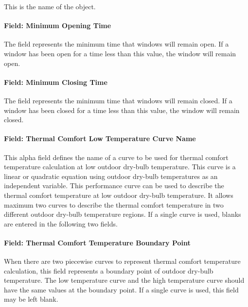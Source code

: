 This is the name of the object.

\paragraph{Field: Minimum Opening Time}\label{field-minimum-opening-time}

The field represents the minimum time that windows will remain open. If a window has been open for a time less than this value, the window will remain open.

\paragraph{Field: Minimum Closing Time}\label{field-minimum-closing-time}

The field represents the minimum time that windows will remain closed. If a window has been closed for a time less than this value, the window will remain closed.

\paragraph{Field: Thermal Comfort Low Temperature Curve Name}\label{field-thermal-comfort-low-temperature-curve-name}

This alpha field defines the name of a curve to be used for thermal comfort temperature calculation at low outdoor dry-bulb temperature. This curve is a linear or quadratic equation using outdoor dry-bulb temperatures as an independent variable. This performance curve can be used to describe the thermal comfort temperature at low outdoor dry-bulb temperature. It allows maximum two curves to describe the thermal comfort temperature in two different outdoor dry-bulb temperature regions. If a single curve is used, blanks are entered in the following two fields.

\paragraph{Field: Thermal Comfort Temperature Boundary Point}\label{field-thermal-comfort-temperature-boundary-point}

When there are two piecewise curves to represent thermal comfort temperature calculation, this field represents a boundary point of outdoor dry-bulb temperature. The low temperature curve and the high temperature curve should have the same values at the boundary point. If a single curve is used, this field may be left blank.

